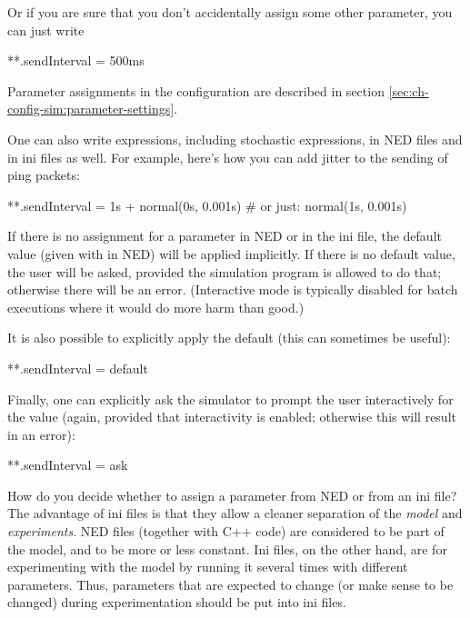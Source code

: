 Or if you are sure that you don't accidentally assign some other
 parameter, you can just write

\begin{inifile}
**.sendInterval = 500ms
\end{inifile}

Parameter assignments in the configuration are described in section
\ref{sec:ch-config-sim:parameter-settings}.

One can also write expressions, including stochastic expressions, in
NED files and in ini files as well. For example, here's how you can
add jitter to the sending of ping packets:

\begin{inifile}
**.sendInterval = 1s + normal(0s, 0.001s)  # or just: normal(1s, 0.001s)
\end{inifile}

If there is no assignment for a parameter in NED or in the ini file, the
default value (given with  in NED) will be applied
implicitly. If there is no default value, the user will be asked, provided
the simulation program is allowed to do that; otherwise there will be an
error. (Interactive mode is typically disabled for batch executions where
it would do more harm than good.)

It is also possible to explicitly apply the default (this can sometimes
be useful):

\begin{inifile}
**.sendInterval = default
\end{inifile}

Finally, one can explicitly ask the simulator to prompt the user interactively
for the value (again, provided that interactivity is enabled; otherwise
this will result in an error):

\begin{inifile}
**.sendInterval = ask
\end{inifile}

\begin{note}
    How do you decide whether to assign a parameter from NED or from an ini
    file? The advantage of ini files is that they allow a cleaner separation of the \textit{model}
    and \textit{experiments}. NED files (together with C++ code) are considered
    to be part of the model, and to be more or less constant. Ini files, on
    the other hand, are for experimenting with the model by running it
    several times with different parameters. Thus, parameters that are expected
    to change (or make sense to be changed) during experimentation should be
    put into ini files.
\end{note}


